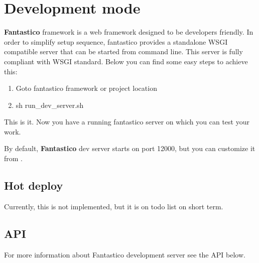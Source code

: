 \documentclass[letterpaper,10pt,english]{sphinxmanual}
\begin{document}
\section{Development mode}
\label{get_started/dev_mode::doc}\label{get_started/dev_mode:development-mode}
\textbf{Fantastico} framework is a web framework designed to be developers friendly. In order to simplify setup sequence, fantastico
provides a standalone WSGI compatible server that can be started from command line. This server is fully compliant with WSGI
standard. Below you can find some easy steps to achieve this:
\begin{enumerate}
\item {} 
Goto fantastico framework or project location

\item {} 
sh run\_dev\_server.sh

\end{enumerate}

This is it. Now you have a running fantastico server on which you can test your work.

By default, \textbf{Fantastico} dev server starts on port 12000, but you can customize it from
{\hyperref[get_started/settings:fantastico.settings.BasicSettings]{}}.


\subsection{Hot deploy}
\label{get_started/dev_mode:hot-deploy}
Currently, this is not implemented, but it is on todo list on short term.


\subsection{API}
\label{get_started/dev_mode:api}
For more information about Fantastico development server see the API below.
\end{document}

